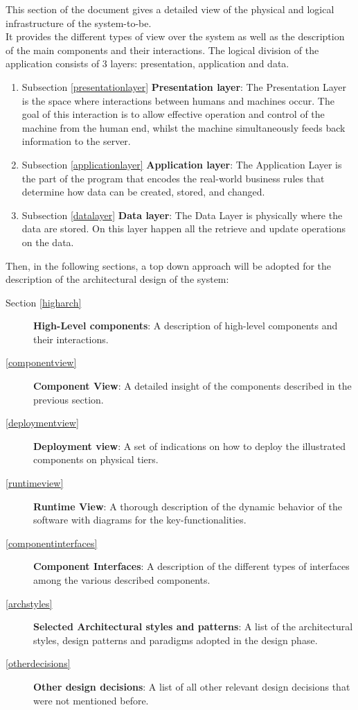 This section of the document gives a detailed view of the physical and logical infrastructure of the system-to-be. 
\\It provides the different types of view over the system as well as the description of the main components and their interactions.
The logical division of the application consists of 3 layers: presentation, application and data.
\begin{enumerate}
	\item Subsection \ref{presentationlayer} \textbf{Presentation layer}: The Presentation Layer is the space where interactions between humans and machines occur. The goal of this interaction is to allow effective operation and control of the machine from the human end, whilst the machine simultaneously feeds back information to the server.
	\item Subsection \ref{applicationlayer} \textbf{Application layer}: The Application Layer is the part of the program that encodes the real-world business rules that determine how data can be created, stored, and changed.
	\item Subsection \ref{datalayer} \textbf{Data layer}: The Data Layer is physically where the data are stored. On this layer happen all the retrieve and update operations on the data. 
\end{enumerate}

Then, in the following sections, a top down approach will be adopted for the description of the architectural design of the system:
\begin{description}
	\item[Section \ref{higharch}] \textbf{High-Level components}: A description of high-level components and their interactions.
	\item[\ref{componentview}] \textbf{Component View}: A detailed insight of the components described in the previous section.
	\item[\ref{deploymentview}] \textbf{Deployment view}: A set of indications on how to deploy the illustrated components on physical tiers.
	\item[\ref{runtimeview}] \textbf{Runtime View}: A thorough description of the dynamic behavior of the software with diagrams for the key-functionalities.
	\item[\ref{componentinterfaces}] \textbf{Component Interfaces}: A description of the different types of interfaces among the various described components.
	\item[\ref{archstyles}] \textbf{Selected Architectural styles and patterns}: A list of the architectural styles, design patterns and paradigms adopted in the design phase.
	\item[\ref{otherdecisions}] \textbf{Other design decisions}: A list of all other relevant design decisions that were not mentioned before.
\end{description}
